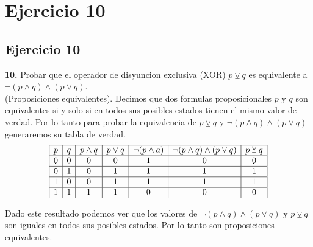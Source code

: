\chapter*{Ejercicio 10}
\section*{Ejercicio 10}

\textbf{10.} Probar que el operador de disyuncion exclusiva (XOR) $p \veebar q$ es equivalente a $\neg (p \land q) \land (p \lor q)$.\\
\newline
(Proposiciones equivalentes). Decimos que dos formulas proposicionales $p$ y $q$ son equivalentes si y solo si en todos sus posibles estados tienen el mismo valor de verdad.
Por lo tanto para probar la equivalencia de $p \veebar q$ y $\neg (p \land q) \land (p \lor q)$ generaremos su tabla de verdad. \\
\newline
\[
\begin{array}{|c|c|c|c|c|c|c|}
\hline
p & q & p \land q & p \lor q & \neg (p \land a) & \neg (p \land q) \land (p \lor q) & p \veebar q \\
\hline
0 & 0 & 0 & 0 & 1 & 0 & 0 \\
\hline
0 & 1 & 0 & 1 & 1 & 1 & 1 \\
\hline
1 & 0 & 0 & 1 & 1 & 1 & 1 \\
\hline
1 & 1 & 1 & 1 & 0 & 0 & 0 \\
\hline
\end{array}
\]

Dado este resultado podemos ver que los valores de $\neg (p \land q) \land (p \lor q)$ y $p \veebar q$ son iguales en todos sus posibles estados. Por lo tanto son proposiciones equivalentes.
